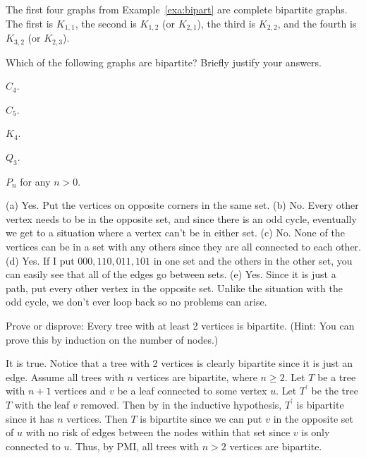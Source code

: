 \begin{exa}
The first four graphs from Example~\ref{exa:bipart} are complete bipartite graphs.
The first is $K_{1,1}$, the second is $K_{1,2}$ (or $K_{2,1}$), the third is $K_{2,2}$, and the
fourth is $K_{3,2}$ (or $K_{2,3}$).
\end{exa}

\begin{exer}
Which of the following graphs are bipartite? 
Briefly justify your answers.
\begin{lenum}
\item $C_4$. \blanklinefill
\item $C_5$. \blanklinefill
\item $K_4$. \blanklinefill
\item $Q_3$. \blanklinefill
\item $P_n$ for any $n>0$. \blanklinefill
\end{lenum}
\begin{answer}
(a) Yes. Put the vertices on opposite corners in the same
 set.
(b) No. Every other vertex needs to be in the opposite
set, and since there is an odd cycle, eventually
we get to a situation where a vertex can't be in either set.
(c) No. None of the vertices can be in a set with 
any others since they are all connected to each other.
(d) Yes. If I put $000, 110, 011, 101$ in one set and
the others in the other set, you can easily
see that all of the edges go between sets.
(e) Yes. Since it is just a path, put every other vertex in 
the opposite set. Unlike the situation with the odd cycle,
we don't ever loop back so no problems can arise.
\end{answer}
\end{exer}


\begin{ques}
Prove or disprove: 
Every tree with at least 2 vertices is bipartite.
(Hint: You can prove this by induction on the number
of nodes.)
\vspace*{1.5in}
\begin{answer}
It is true. Notice that a tree with 2 vertices is clearly 
bipartite since it is just an edge.
Assume all trees with $n$ vertices are bipartite,
where $n\geq 2$.
Let $T$ be a tree with $n+1$ vertices and $v$ be a leaf
connected to some vertex $u$.
Let $T^{\prime}$ be the tree $T$ with the leaf $v$ removed. Then by in the inductive hypothesis, $T^{\prime}$ is bipartite since it has $n$ vertices.
Then $T$ is bipartite since we can put $v$ in the
opposite set of $u$ with no risk of edges between
the nodes within that set since
 $v$ is only connected to $u$.
Thus, by PMI, all trees with $n>2$ vertices are bipartite.
\end{answer}
\end{ques}
\newpage

